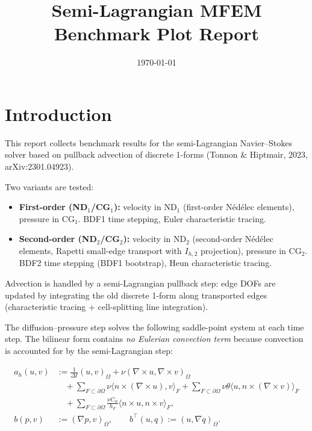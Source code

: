 \documentclass[11pt]{article}
\title{Semi-Lagrangian MFEM Benchmark Plot Report}
\date{\today}
\begin{document}
\maketitle

\section*{Introduction}

This report collects benchmark results for the semi-Lagrangian
Navier--Stokes solver based on pullback advection of discrete 1-forms
(Tonnon \& Hiptmair, 2023, arXiv:2301.04923).

Two variants are tested:
\begin{itemize}
\item \textbf{First-order (ND$_1$/CG$_1$):} velocity in $\mathrm{ND}_1$
  (first-order N\'ed\'elec elements), pressure in $\mathrm{CG}_1$.
  BDF1 time stepping, Euler characteristic tracing.
\item \textbf{Second-order (ND$_2$/CG$_2$):} velocity in $\mathrm{ND}_2$
  (second-order N\'ed\'elec elements, Rapetti small-edge transport with
  $I_{h,2}$ projection), pressure in $\mathrm{CG}_2$.  BDF2 time stepping
  (BDF1 bootstrap), Heun characteristic tracing.
\end{itemize}

Advection is handled by a
semi-Lagrangian pullback step: edge DOFs are updated by integrating the
old discrete 1-form along transported edges (characteristic tracing +
cell-splitting line integration).

The diffusion--pressure step solves the following saddle-point system at each
time step.  The bilinear form contains \emph{no Eulerian convection term}
because convection is accounted for by the semi-Lagrangian step:

\begin{align}
	a_h(u,v)
	       & := \frac{1}{\Delta t}(u,v)_\Omega
	+ \nu(\nabla\times u,\nabla\times v)_\Omega                                                            \\
	       & \quad + \sum_{F\subset\partial\Omega}\nu\langle n\times(\nabla\times u),v\rangle_F
	+ \sum_{F\subset\partial\Omega}\nu\theta\langle u,n\times(\nabla\times v)\rangle_F                     \\
	       & \quad + \sum_{F\subset\partial\Omega}\frac{\nu C_w}{h_F}\langle n\times u,n\times v\rangle_F,
	\\[0.2em]
	b(p,v) & := (\nabla p,v)_\Omega,
	\qquad b^\top(u,q):=(u,\nabla q)_\Omega.
\end{align}
\end{document}
